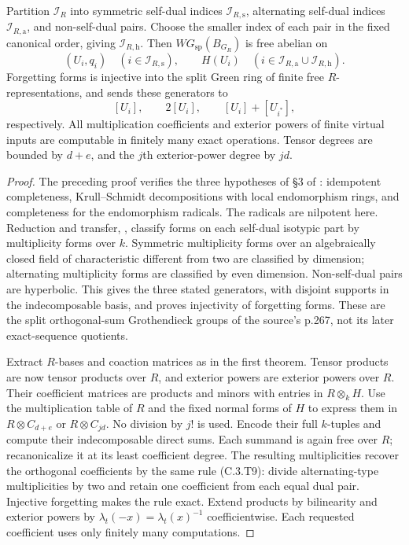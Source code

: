 \begin{theorem}
\label{C:artinian_algclosed_WG}
Partition $\mathscr I_R$ into symmetric self-dual indices
$\mathscr I_{R,\mathrm s}$, alternating self-dual indices
$\mathscr I_{R,\mathrm a}$, and non-self-dual pairs. Choose the smaller
index of each pair in the fixed canonical order, giving
$\mathscr I_{R,\mathrm h}$. Then
$WG_{\mathrm{sp}}(B_{G_R})$ is free abelian on
\[
 (U_i,q_i)\quad(i\in\mathscr I_{R,\mathrm s}),\qquad
 H(U_i)\quad(i\in\mathscr I_{R,\mathrm a}\cup
                         \mathscr I_{R,\mathrm h}).
\]
Forgetting forms is injective into the split Green ring of finite free
$R$-representations, and sends these generators to
\[
 [U_i],\qquad 2[U_i],\qquad [U_i]+[U_{i^*}],
\]
respectively. All multiplication coefficients and exterior powers of
finite virtual inputs are computable in finitely many exact operations.
Tensor degrees are bounded by $d+e$, and the $j$th exterior-power degree
by $jd$.
\end{theorem}
\begin{proof}
The preceding proof verifies the three hypotheses of \S3 of
\cite{C-QSS1979}: idempotent completeness, Krull--Schmidt decompositions
with local endomorphism rings, and completeness for the endomorphism
radicals. The radicals are nilpotent here. Reduction and transfer,
\cite[Theorem 2.2, Corollary 2.3 and Theorems 3.2--3.3,
pp.269--273]{C-QSS1979}, classify forms on each self-dual isotypic part
by multiplicity forms over $k$. Symmetric multiplicity forms over an
algebraically closed field of characteristic different from two are
classified by dimension; alternating multiplicity forms are classified
by even dimension. Non-self-dual pairs are hyperbolic. This gives the
three stated generators, with disjoint supports in the indecomposable
basis, and proves injectivity of forgetting forms. These are the split
orthogonal-sum Grothendieck groups of the source's p.267, not its later
exact-sequence quotients.

Extract $R$-bases and coaction matrices as in the first theorem. Tensor
products are now tensor products over $R$, and exterior powers are exterior
powers over $R$. Their coefficient matrices are products and minors with
entries in $R\otimes_k H$. Use the multiplication table of $R$ and the
fixed normal forms of $H$ to express them in $R\otimes C_{d+e}$ or
$R\otimes C_{jd}$. No division by $j!$ is used. Encode their full
$k$-tuples and compute their indecomposable direct sums. Each summand is
again free over $R$; recanonicalize it at its least coefficient degree.
The resulting multiplicities recover the orthogonal coefficients by the
same rule (C.3.T9): divide alternating-type multiplicities by two and
retain one coefficient from each equal dual pair. Injective forgetting
makes the rule exact. Extend products by bilinearity and exterior powers
by $\lambda_t(-x)=\lambda_t(x)^{-1}$ coefficientwise. Each requested
coefficient uses only finitely many computations.
\end{proof}

